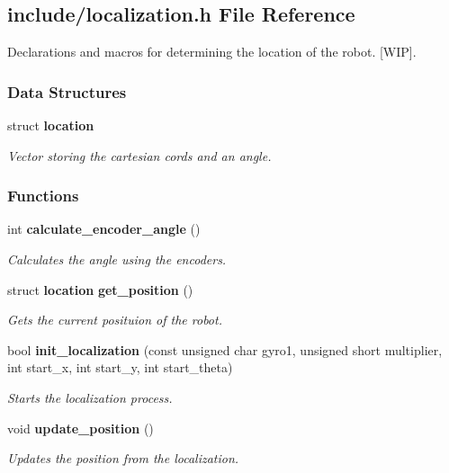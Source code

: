 \subsection{include/localization.h File Reference}
\label{localization_8h}


Declarations and macros for determining the location of the robot. [W\+IP].  


\subsubsection*{Data Structures}
\begin{DoxyCompactItemize}
\item 
struct \textbf{ location}
\begin{DoxyCompactList}\small\item\em Vector storing the cartesian cords and an angle. \end{DoxyCompactList}\end{DoxyCompactItemize}
\subsubsection*{Functions}
\begin{DoxyCompactItemize}
\item 
int \textbf{ calculate\+\_\+encoder\+\_\+angle} ()
\begin{DoxyCompactList}\small\item\em Calculates the angle using the encoders. \end{DoxyCompactList}\item 
struct \textbf{ location} \textbf{ get\+\_\+position} ()
\begin{DoxyCompactList}\small\item\em Gets the current posituion of the robot. \end{DoxyCompactList}\item 
bool \textbf{ init\+\_\+localization} (const unsigned char gyro1, unsigned short multiplier, int start\+\_\+x, int start\+\_\+y, int start\+\_\+theta)
\begin{DoxyCompactList}\small\item\em Starts the localization process. \end{DoxyCompactList}\item 
void \textbf{ update\+\_\+position} ()
\begin{DoxyCompactList}\small\item\em Updates the position from the localization. \end{DoxyCompactList}\end{DoxyCompactItemize}


